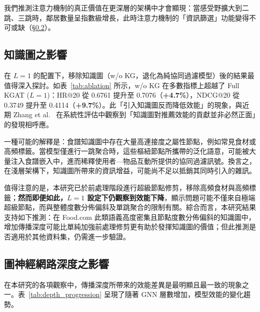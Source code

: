 我們推測注意力機制的真正價值在更深層的架構中才會顯現：當感受野擴大到二跳、三跳時，鄰居數量呈指數級增長，此時注意力機制的「資訊篩選」功能變得不可或缺（§\ref{sec:depth}）。

\subsection{知識圖之影響}
\label{sec:kg_ablation}

在 $L{=}1$ 的配置下，移除知識圖（w/o KG，退化為純協同過濾模型）後的結果最值得深入探討。如表~\ref{tab:ablation} 所示，w/o KG 在多數指標上超越了 Full KGAT ($L{=}1$)：HR@20 從 0.6761 提升至 0.7076（\textbf{+4.7\%}），NDCG@20 從 0.3749 提升至 0.4114（\textbf{+9.7\%}）。此「引入知識圖反而降低效能」的現象，與近期 Zhang et al.~\cite{zhang2024kg4receval} 在系統性評估中觀察到「知識圖對推薦效能的貢獻並非必然正面」的發現相呼應。

一種可能的解釋是：食譜知識圖中存在大量高連接度之屬性節點，例如常見食材或高頻標籤。當模型僅進行一跳聚合時，這些樞紐節點所攜帶的泛化語意，可能被大量注入食譜嵌入中，進而稀釋使用者—物品互動所提供的協同過濾訊號。換言之，在淺層架構下，知識圖所帶來的資訊增益，可能尚不足以抵銷其同時引入的雜訊。

值得注意的是，本研究已於前處理階段進行超級節點修剪，移除高頻食材與高頻標籤；\textbf{然而即便如此，$L{=}1$ 設定下仍觀察到效能下降}，顯示問題可能不僅來自極端超級節點，而與整體度數分佈偏斜及單跳聚合的限制有關。綜合而言，本研究結果支持如下推測：在 Food.com 此類語義高度密集且節點度數分佈偏斜的知識圖中，增加傳播深度可能比單純加強前處理修剪更有助於發揮知識圖的價值；但此推測是否適用於其他資料集，仍需進一步驗證。

\subsection{圖神經網路深度之影響}
\label{sec:depth}

在本研究的各項觀察中，傳播深度所帶來的效能差異是最明顯且最一致的現象之一。表~\ref{tab:depth_progression} 呈現了隨著 GNN 層數增加，模型效能的變化趨勢。

